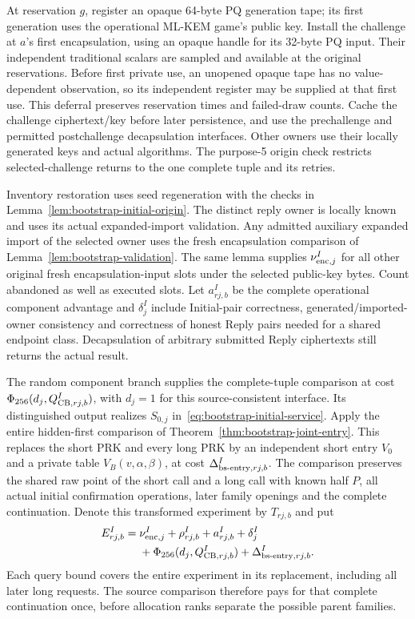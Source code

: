 \documentclass[pdflatex]{sn-jnl}
\theoremstyle{thmstyleone}
\theoremstyle{thmstylethree}
\theoremstyle{thmstyletwo}
\begin{document}
At reservation $g$, register an opaque 64-byte PQ generation tape; its
first generation uses the operational ML-KEM game's public key. Install
the challenge at $a$'s first encapsulation, using an opaque handle for
its 32-byte PQ input. Their independent traditional scalars are sampled
and available at the original reservations.
Before first private use, an unopened opaque tape has no value-dependent
observation, so its independent register may be supplied at that first use.
This deferral preserves reservation times and failed-draw counts. Cache
the challenge ciphertext/key before later persistence, and use the
prechallenge and permitted postchallenge decapsulation interfaces. Other
owners use their locally generated keys and actual algorithms.
The purpose-5 origin check restricts selected-challenge returns to the
one complete tuple and its retries.

Inventory restoration uses seed regeneration with the checks in
Lemma~\ref{lem:bootstrap-initial-origin}. The distinct reply owner is
locally known and uses its actual expanded-import validation. Any
admitted auxiliary expanded import of the selected owner uses the
fresh encapsulation comparison of
Lemma~\ref{lem:bootstrap-validation}. The same lemma supplies
$\nu^I_{{\rm enc},j}$ for all other original fresh encapsulation-input
slots under the selected public-key bytes. Count abandoned as well as
executed slots. Let $a^I_{rj,b}$ be the complete operational component
advantage and $\delta^I_j$ include Initial-pair correctness,
generated/imported-owner consistency and correctness of honest Reply
pairs needed for a shared endpoint class. Decapsulation of arbitrary
submitted Reply ciphertexts still returns the actual result.

The random component branch supplies the complete-tuple comparison at
cost $\Phi_{256}(d_j,Q^I_{{\rm CB},rj,b})$, with $d_j=1$ for this
source-consistent interface. Its distinguished output realizes
$S_{0,j}$ in~\eqref{eq:bootstrap-initial-service}. Apply the entire
hidden-first comparison of
Theorem~\ref{thm:bootstrap-joint-entry}. This replaces the short PRK
and every long PRK by an independent short entry $V_0$ and a private
table $V_B(v,\alpha,\beta)$, at cost
$\Delta^I_{{\rm bs\text{-}entry},rj,b}$. The comparison preserves the shared raw
point of the short call and a long call with known half $P$, all actual
initial confirmation operations, later family openings and the complete
continuation. Denote this transformed experiment by $T_{rj,b}$ and put
\begin{equation}
 \begin{split}
 E^I_{rj,b}={}&\nu^I_{{\rm enc},j}+\rho^I_{rj,b}+a^I_{rj,b}
                     +\delta^I_j\\
             &+\Phi_{256}(d_j,Q^I_{{\rm CB},rj,b})
                     +\Delta^I_{{\rm bs\text{-}entry},rj,b}.
 \end{split}
 \label{eq:bootstrap-initial-upstream}
\end{equation}
Each query bound covers the entire experiment in its replacement,
including all later long requests. The source comparison therefore pays
for that complete continuation once, before allocation ranks separate
the possible parent families.
\end{document}
